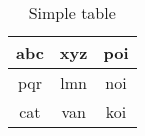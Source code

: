 \documentclass[12pt,a4paper,oneside]{book}
\begin{document}
            \begin{table}
                \centering
                \begin{tabular}{|c|c|c|}
                    \hline
                      abc & xyz & poi \\
                     \hline
                     pqr &  lmn & noi\\
                    \hline
                    cat & van & koi \\
                    \hline
                \end{tabular}
                \caption{Simple table}
            \end{table}
        

\end{document}
